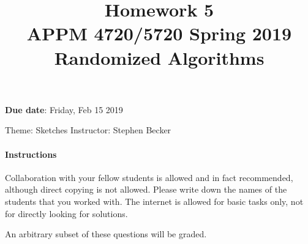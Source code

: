 \documentclass[10pt, letterpaper]{scrartcl}
\title{Homework 5 \solTitle{Selected Solutions} \\APPM 4720/5720 Spring 2019 \\ Randomized Algorithms}
\date{}
\newenvironment{instructions}{}{}
\begin{document}
\maketitle
\vspace{-6em}
\textbf{Due date}: Friday, Feb 15 2019

Theme: Sketches   \hfill Instructor: Stephen Becker %

\begin{instructions}
\paragraph{Instructions}
Collaboration with your fellow students is allowed and in fact recommended, although direct copying is not allowed.  Please write down the names of the students that you worked with. The internet is allowed for basic tasks only, not for directly looking for solutions.

An arbitrary subset of these questions will be graded.

\end{instructions}
\end{document}
